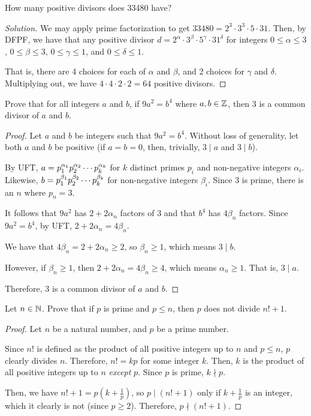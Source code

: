 \begin{recommended}
  How many positive divisors does 33480 have?
\end{recommended}
\begin{proof}[Solution]
  We may apply prime factorization to get $33480=2^3\cdot3^3\cdot5\cdot31$.
  Then, by DFPF, we have that any positive divisor $d=2^\alpha\cdot3^\beta\cdot5^\gamma\cdot31^\delta$
  for integers $0\leq\alpha\leq3$, $0\leq\beta\leq3$, $0\leq\gamma\leq1$, and $0\leq\delta\leq1$.

  That is, there are 4 choices for each of $\alpha$ and $\beta$, and 2 choices for $\gamma$ and $\delta$.
  Multiplying out, we have $4\cdot4\cdot2\cdot2=64$ positive divisors.
\end{proof}


\begin{recommended}
  Prove that for all integers $a$ and $b$,
  if $9a^2 = b^4$ where $a,b\in\mathbb{Z}$, then 3 is a common divisor of $a$ and $b$.
\end{recommended}
\begin{proof}
  Let $a$ and $b$ be integers such that $9a^2=b^4$.
  Without loss of generality, let both $a$ and $b$ be positive
  (if $a=b=0$, then, trivially, $3 \mid a$ and $3 \mid b$).

  By UFT, $a=\pf{\alpha_#1}{k}$ for $k$ distinct primes $p_i$ and non-negative integers $\alpha_i$.
  Likewise, $b=\pf{\beta_#1}{k}$ for non-negative integers $\beta_i$.
  Since 3 is prime, there is an $n$ where $p_n=3$.

  It follows that $9a^2$ has $2+2\alpha_n$ factors of 3 and that $b^4$ has $4\beta_n$ factors.
  Since $9a^2=b^4$, by UFT, $2+2\alpha_n=4\beta_n$.

  We have that $4\beta_n = 2+2\alpha_n \geq 2$, so $\beta_n \geq 1$, which means $3 \mid b$.

  However, if $\beta_n \geq 1$, then $2+2\alpha_n = 4\beta_n \geq 4$, which means $\alpha_n \geq 1$.
  That is, $3 \mid a$.

  Therefore, 3 is a common divisor of $a$ and $b$.
\end{proof}


\begin{recommended}
  Let $n\in\mathbb{N}$. Prove that if $p$ is prime and $p \leq n$, then $p$ does not divide $n! + 1$.
\end{recommended}
\begin{proof}
  Let $n$ be a natural number, and $p$ be a prime number.

  Since $n!$ is defined as the product of all positive integers up to $n$ and $p \leq n$, $p$ clearly divides $n$.
  Therefore, $n! = kp$ for some integer $k$.
  Then, $k$ is the product of all positive integers up to $n$ \emph{except} $p$.
  Since $p$ is prime, $k \nmid p$.

  Then, we have $n!+1 = p(k+\frac{1}{p})$, so $p \mid (n!+1)$ only if $k+\frac{1}{p}$ is an integer,
  which it clearly is not (since $p \geq 2$).
  Therefore, $p \nmid (n!+1)$.
\end{proof}


